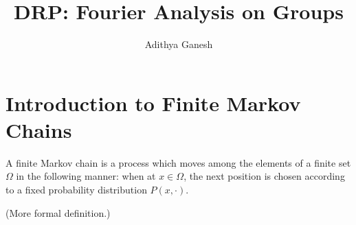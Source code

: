 \documentclass[12pt]{article}
\title{DRP: Fourier Analysis on Groups}
\author{Adithya Ganesh}
\begin{document}
\maketitle
\section{Introduction to Finite Markov Chains}

A finite Markov chain is a process which moves among the elements of a finite set $\Omega$ in the following manner: when at $x \in \Omega$, the next position is chosen according to a fixed probability distribution $P(x, \cdot)$.

(More formal definition.)

\begin{theorem}

\end{theorem}
\end{document}
